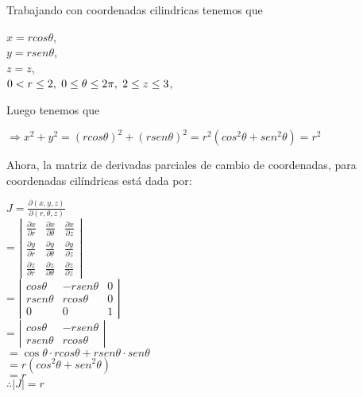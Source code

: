 Trabajando con coordenadas cilindricas tenemos que 
\begin{center}
    $x = r cos \theta$, \\
    \vspace{5 pt}
    $y = r sen \theta$, \\
    \vspace{5 pt}
    $z = z$, \\
    \vspace{5 pt}
    $0 < r \leq 2, \hspace{3 pt} 0 \leq \theta \leq 2 \pi, \hspace{3 pt} 2 \leq z \leq 3$, \\
\end{center}
\vspace{15 pt}
Luego tenemos que 
\begin{center}
    $\Rightarrow x^2 + y^2  = (r cos\theta)^2 + (r sen\theta)^2  = r^2 (cos^2\theta +  sen^2 \theta) = r^2$
\end{center}
\vspace{15 pt}
Ahora, la matriz de derivadas parciales de cambio de coordenadas, para coordenadas cilíndricas está dada por:
\begin{center}
    $\displaystyle J = \frac{\partial(x, y, z)}{\partial (r, \theta, z)} $\\
    \vspace{10 pt}
    = $\displaystyle\left|
    \begin{array}{ccc}
    \frac{\partial x}{\partial r} & \frac{\partial x}{\partial \theta} & \frac{\partial x}{\partial z} \\[10pt]
    \frac{\partial y}{\partial r} & \frac{\partial y}{\partial \theta} & \frac{\partial y}{\partial z} \\[10pt]
    \frac{\partial z}{\partial r} & \frac{\partial z}{\partial \theta} & \frac{\partial z}{\partial z}
    \end{array}
    \right|$\\
    \vspace{10 pt}
    = $\displaystyle\left|
    \begin{array}{ccc}
    cos\theta & -r sen\theta & 0 \\[5pt]
    r sen\theta & rcos\theta & 0 \\[5pt]
    0 & 0 & 1
    \end{array}
    \right|$\\
    \vspace{10 pt}
    = $\displaystyle\left|
    \begin{array}{ccc}
    cos\theta & -r sen\theta \\[5pt]
    r sen\theta & rcos\theta 
    \end{array}
    \right|$\\
    \vspace{10 pt}
    $=\cos \theta \cdot r cos \theta + r sen \theta \cdot sen \theta$\\
    \vspace{10 pt}
    $= r (cos^2 \theta +  sen^2 \theta)$\\
    \vspace{10 pt}
    $= r$\\
    \vspace{15 pt}
    $\therefore |J| =  r$
\end{center}
